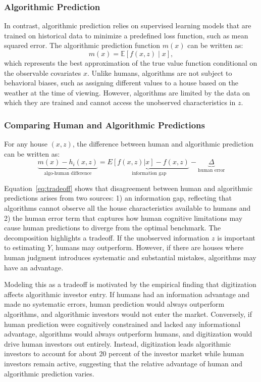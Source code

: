 \documentclass[11pt]{article}
\begin{document}
    
\subsubsection{Algorithmic Prediction}
In contrast, algorithmic prediction relies on supervised learning models that are trained on historical data to minimize a predefined loss function, such as mean squared error. The algorithmic prediction function  $m(x)$ can be written as:
\[
m(x) = \mathbb{E}[f(x, z) \mid x],
\]
which represents the best approximation of the true value function conditional on the observable covariates \(x\). Unlike humans, algorithms are not subject to behavioral biases, such as assigning different values to a house based on the weather at the time of viewing. However, algorithms are limited by the data on which they are trained and cannot access the unobserved characteristics in \(z\).


\subsubsection{Comparing Human and Algorithmic Predictions}
For any house $(x,z)$, the difference between human and algorithmic prediction can be written as:
\begin{equation} \label{eq:tradeoff}
    \underbrace{m(x) - h_i(x,z)}_{\text{algo-human difference}} = \underbrace{E[f(x,z)|x] - f(x,z)}_{\text{ information gap}} - \underbrace{\Delta}_{\text{human error}}
\end{equation}

Equation~\eqref{eq:tradeoff} shows that disagreement between human and algorithmic predictions arises from two sources: 1) an information gap, reflecting that algorithms cannot observe all the house characteristics available to humans and 2) the human error term that captures how human cognitive limitations  may cause human predictions to diverge from the optimal benchmark. The decomposition highlights a tradeoff. If the unobserved information $z$ is important to estimating $Y$, humans may outperform. However, if there are houses where human judgment introduces systematic and substantial mistakes, algorithms may have an advantage.  

Modeling this as a tradeoff is motivated by the empirical finding that digitization affects algorithmic investor entry. If humans had an information advantage and made no systematic errors, human prediction would always outperform algorithms, and algorithmic investors would not enter the market. Conversely, if human prediction were cognitively constrained and lacked any informational advantage, algorithms would always outperform humans, and digitization would drive human investors out entirely. Instead, digitization leads algorithmic investors to account for about 20 percent of the investor market while human investors remain active, suggesting that the relative advantage of human and algorithmic prediction varies.
\end{document}
